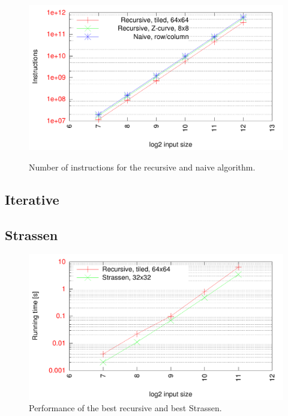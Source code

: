 \begin{figure}[h!]
  \centering
  \includegraphics[width=\textwidth]{"../project2/gnuplots/recursive_instructions"}
  \label{fig:recursive_layout_instructions}
  \caption{Number of instructions for the recursive and naive algorithm.}
\end{figure}

\subsection{Iterative}


\subsection{Strassen}


\begin{figure}[h!]
  \centering
  \includegraphics[width=\textwidth]{"../project2/gnuplots/recursive_vs_strassen_performance"}
  \caption{Performance of the best recursive and best Strassen.}
  \label{fig:recursive_vs_strassen_performance}
\end{figure}

